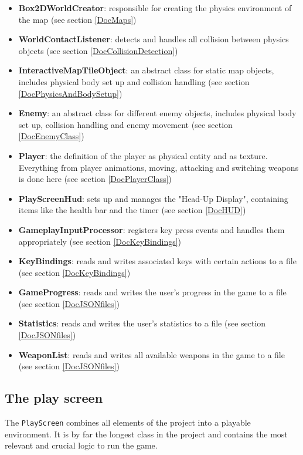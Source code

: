 \documentclass[12p]{article}
\begin{document}
\begin{itemize}
  \item \textbf{Box2DWorldCreator}: responsible for creating the physics environment of the map (see section \ref{DocMaps})
  \item \textbf{WorldContactListener}: detects and handles all collision between physics objects (see section \ref{DocCollisionDetection})
  \item \textbf{InteractiveMapTileObject}: an abstract class for static map objects, includes physical body set up and collision handling (see section \ref{DocPhysicsAndBodySetup})
  \item \textbf{Enemy}: an abstract class for different enemy objects, includes physical body set up, collision handling and enemy movement (see section \ref{DocEnemyClass})
  \item \textbf{Player}: the definition of the player as physical entity and as texture. Everything from player animations, moving, attacking and switching weapons is done here (see section \ref{DocPlayerClass})
  \item \textbf{PlayScreenHud}: sets up and manages the "Head-Up Display", containing items like the health bar and the timer (see section \ref{DocHUD})
  \item \textbf{GameplayInputProcessor}: registers key press events and handles them appropriately (see section \ref{DocKeyBindings})
  \item \textbf{KeyBindings}: reads and writes associated keys with certain actions to a file (see section \ref{DocKeyBindings})
  \item \textbf{GameProgress}: reads and writes the user's progress in the game to a file (see section \ref{DocJSONfiles})
  \item \textbf{Statistics}: reads and writes the user's statistics to a file (see section \ref{DocJSONfiles})
  \item \textbf{WeaponList}: reads and writes all available weapons in the game to a file (see section \ref{DocJSONfiles})
\end{itemize}

 
 \newpage
\subsection{The play screen} \label{DocPlayScreen}

The \texttt{PlayScreen} combines all elements of the project into a playable environment. It is by far the longest class in the project and contains the most relevant and crucial logic to run the game.
\end{document}

